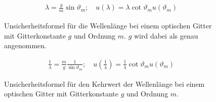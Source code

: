 \begin{figure}[ht]
	\begin{align*}
		\lambda = \frac{g}{m} \sin \vartheta_m
		;\quad
		u(\lambda) = \lambda \cot \vartheta_m u(\vartheta_m)
	\end{align*}
	\caption{Unsicherheitsformel für die Wellenlänge bei einem optischen Gitter mit Gitterkonstante $g$ und Ordnung $m$. $g$ wird dabei als genau angenommen.}
	\label{unc:lambda}
\end{figure}

\begin{figure}[ht]
\begin{align*}
	\frac{1}{\lambda} = \frac{m}{g} \frac{1}{\sin \vartheta_m}
	;\quad
	u(\frac{1}{\lambda}) = \frac{1}{\lambda} \cot \vartheta_m u(\vartheta_m)
\end{align*}
\caption{Unsicherheitsformel für den Kehrwert der Wellenlänge bei einem optischen Gitter mit Gitterkonstante $g$ und Ordnung $m$.}
\label{unc:1-lambda}
\end{figure}
